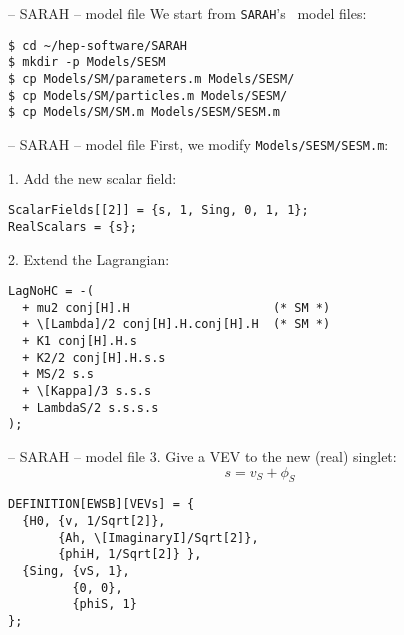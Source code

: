 \documentclass[11pt]{beamer}
\newcommand{\SARAH}{\texttt{SARAH}}
\newcommand{\SM}{\text{SM}}
\begin{document}

\begin{frame}[fragile]{\insertsection -- SARAH -- model file}
  We start from \SARAH's \SM\ model files:
  \begin{lstlisting}
$ cd ~/hep-software/SARAH
$ mkdir -p Models/SESM
$ cp Models/SM/parameters.m Models/SESM/
$ cp Models/SM/particles.m Models/SESM/
$ cp Models/SM/SM.m Models/SESM/SESM.m\end{lstlisting}%
\end{frame}


\begin{frame}[fragile]{\insertsection -- SARAH -- model file}
  First, we modify \texttt{Models/SESM/SESM.m}:

  \medskip

  1. Add the new scalar field:
  \begin{lstlisting}
ScalarFields[[2]] = {s, 1, Sing, 0, 1, 1};
RealScalars = {s};\end{lstlisting}
  2. Extend the Lagrangian:
  \begin{lstlisting}
LagNoHC = -(
  + mu2 conj[H].H                    (* SM *)
  + \[Lambda]/2 conj[H].H.conj[H].H  (* SM *)
  + K1 conj[H].H.s
  + K2/2 conj[H].H.s.s
  + MS/2 s.s
  + \[Kappa]/3 s.s.s
  + LambdaS/2 s.s.s.s
);\end{lstlisting}
\end{frame}


\begin{frame}[fragile]{\insertsection -- SARAH -- model file}
  3. Give a VEV to the new (real) singlet:
  \begin{equation*}
    s = v_S + \phi_S
  \end{equation*}
  \begin{lstlisting}
DEFINITION[EWSB][VEVs] = {
  {H0, {v, 1/Sqrt[2]},
       {Ah, \[ImaginaryI]/Sqrt[2]},
       {phiH, 1/Sqrt[2]} },
  {Sing, {vS, 1},
         {0, 0},
         {phiS, 1}
};\end{lstlisting}
\end{frame}

\end{document}
